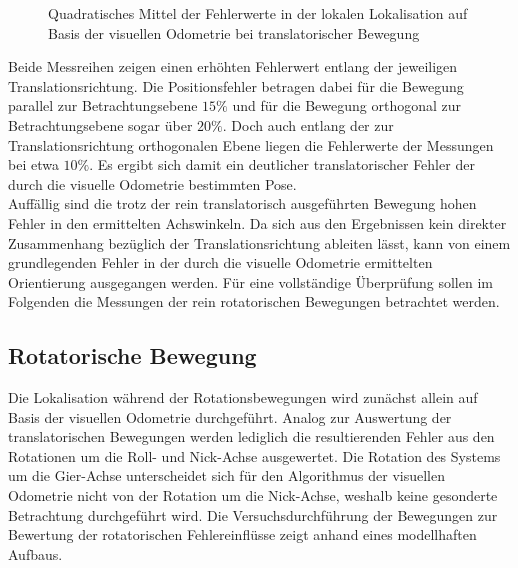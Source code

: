 \begin{figure}

\caption{Quadratisches Mittel der Fehlerwerte in der lokalen Lokalisation auf Basis der visuellen Odometrie bei translatorischer Bewegung}
\label{fig.loc_loc_trans}
\end{figure}

Beide Messreihen zeigen einen erhöhten Fehlerwert entlang der jeweiligen Translationsrichtung. Die Positionsfehler betragen dabei für die Bewegung parallel zur Betrachtungsebene $15\%$ und für die Bewegung orthogonal zur Betrachtungsebene sogar über $20\%$. Doch auch entlang der zur Translationsrichtung orthogonalen Ebene liegen die Fehlerwerte der Messungen bei etwa $10\%$. Es ergibt sich damit ein deutlicher translatorischer Fehler der durch die visuelle Odometrie bestimmten Pose.\\

Auffällig sind die trotz der rein translatorisch ausgeführten Bewegung hohen Fehler in den ermittelten Achswinkeln. Da sich aus den Ergebnissen kein direkter Zusammenhang bezüglich der Translationsrichtung ableiten lässt, kann von einem grundlegenden Fehler in der durch die visuelle Odometrie ermittelten Orientierung ausgegangen werden. Für eine vollständige Überprüfung sollen im Folgenden die Messungen der rein rotatorischen Bewegungen betrachtet werden.


\subsection{Rotatorische Bewegung}

Die Lokalisation während der Rotationsbewegungen wird zunächst allein auf Basis der visuellen Odometrie durchgeführt. Analog zur Auswertung der translatorischen Bewegungen werden lediglich die resultierenden Fehler aus den Rotationen um die Roll- und Nick-Achse ausgewertet. Die Rotation des Systems um die Gier-Achse unterscheidet sich für den Algorithmus der visuellen Odometrie nicht von der Rotation um die Nick-Achse, weshalb keine gesonderte Betrachtung durchgeführt wird. Die Versuchsdurchführung der Bewegungen zur Bewertung der rotatorischen Fehlereinflüsse zeigt  anhand eines modellhaften Aufbaus.\\

